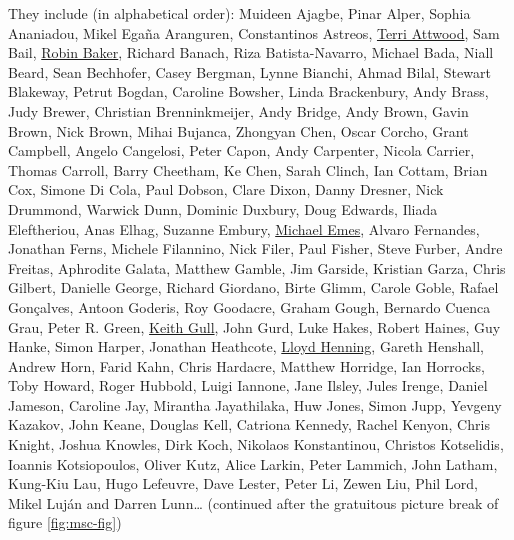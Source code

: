\documentclass[
]{book}
\begin{document}
They include (in alphabetical order): Muideen Ajagbe, Pinar Alper, Sophia Ananiadou, Mikel Egaña Aranguren, Constantinos Astreos, \href{https://en.wikipedia.org/wiki/Terri_Attwood}{Terri Attwood}, Sam Bail, \href{https://en.wikipedia.org/wiki/Robin_Baker_(biologist)}{Robin Baker}, Richard Banach, Riza Batista-Navarro, Michael Bada, Niall Beard, Sean Bechhofer, Casey Bergman, Lynne Bianchi, Ahmad Bilal, Stewart Blakeway, Petrut Bogdan, Caroline Bowsher, Linda Brackenbury, Andy Brass, Judy Brewer, Christian Brenninkmeijer, Andy Bridge, Andy Brown, Gavin Brown, Nick Brown, Mihai Bujanca, Zhongyan Chen, Oscar Corcho, Grant Campbell, Angelo Cangelosi, Peter Capon, Andy Carpenter, Nicola Carrier, Thomas Carroll, Barry Cheetham, Ke Chen, Sarah Clinch, Ian Cottam, Brian Cox, Simone Di Cola, Paul Dobson, Clare Dixon, Danny Dresner, Nick Drummond, Warwick Dunn, Dominic Duxbury, Doug Edwards, Iliada Eleftheriou, Anas Elhag, Suzanne Embury, \href{https://www.uoguelph.ca/mcb/people/dr-michael-j-emes}{Michael Emes}, Alvaro Fernandes, Jonathan Ferns, Michele Filannino, Nick Filer, Paul Fisher, Steve Furber, Andre Freitas, Aphrodite Galata, Matthew Gamble, Jim Garside, Kristian Garza, Chris Gilbert, Danielle George, Richard Giordano, Birte Glimm, Carole Goble, Rafael Gonçalves, Antoon Goderis, Roy Goodacre, Graham Gough, Bernardo Cuenca Grau, Peter R. Green, \href{https://en.wikipedia.org/wiki/Keith_Gull}{Keith Gull}, John Gurd, Luke Hakes, Robert Haines, Guy Hanke, Simon Harper, Jonathan Heathcote, \href{https://github.com/eldog}{Lloyd Henning}, Gareth Henshall, Andrew Horn, Farid Kahn, Chris Hardacre, Matthew Horridge, Ian Horrocks, Toby Howard, Roger Hubbold, Luigi Iannone, Jane Ilsley, Jules Irenge, Daniel Jameson, Caroline Jay, Mirantha Jayathilaka, Huw Jones, Simon Jupp, Yevgeny Kazakov, John Keane, Douglas Kell, Catriona Kennedy, Rachel Kenyon, Chris Knight, Joshua Knowles, Dirk Koch, Nikolaos Konstantinou, Christos Kotselidis, Ioannis Kotsiopoulos, Oliver Kutz, Alice Larkin, Peter Lammich, John Latham, Kung-Kiu Lau, Hugo Lefeuvre, Dave Lester, Peter Li, Zewen Liu, Phil Lord, Mikel Luján and Darren Lunn\ldots{} (continued after the gratuitous picture break of figure \ref{fig:msc-fig})
\end{document}
